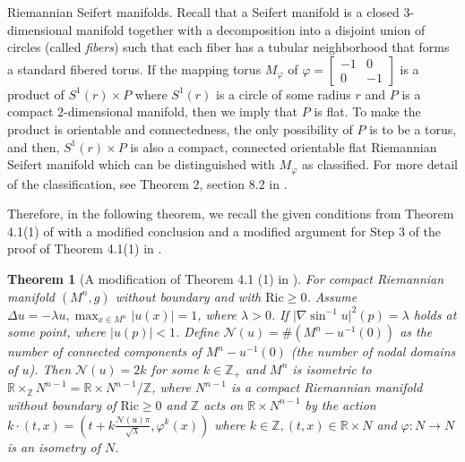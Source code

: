 \documentclass[11pt]{amsart}
\newtheorem{theorem}{Theorem}[section]
\def\ric{\mathrm{Ric}}
\begin{document}
Riemannian Seifert manifolds. Recall that a Seifert manifold is a closed 3-dimensional manifold together with a decomposition into a disjoint union of circles (called \textit{fibers}) such that each fiber has a tubular neighborhood that forms a standard fibered torus. If the mapping torus $M_\varphi$ of $\varphi=\left[\begin{matrix}
    -1&0\\0&-1
\end{matrix}\right]$ is a product of $S^1(r)\times P$ where $S^1(r)$ is a circle of some radius $r$ and $P$ is a compact $2$-dimensional manifold, then we imply that $P$ is flat. To make the product is orientable and connectedness, the only possibility of $P$ is to be a torus, and then, $S^1(r)\times P$ is also a compact, connected orientable flat
Riemannian Seifert manifold which can be distinguished with $M_\varphi$ as classified. For more detail of the classification, see Theorem 2,  section 8.2 in \cite{orlik}. 





Therefore, in the following theorem, we recall the given conditions from Theorem 4.1(1) of \cite{xuxue} with a modified conclusion and a modified argument for Step 3 of the proof of Theorem 4.1(1) in \cite{xuxue}.
\begin{theorem}[A modification of Theorem 4.1 (1) in \cite{xuxue}]\label{uoa}
   For compact Riemannian manifold $(M^n,g)$ without boundary and with $\ric\geq 0$. Assume $\Delta u=-\lambda u,\max_{x\in M^n}\vert u(x)\vert=1$, where $\lambda>0$. If $\vert\nabla\sin^{-1} u\vert^2 (p)=\lambda$ holds at some point, where $\vert u(p)\vert<1$. Define $\mathcal{N}(u)=\#(M^n-u^{-1}(0))$ as the number of connected components of $M^n-u^{-1}(0)$ (the number of nodal domains of $u$). Then $\mathcal{N}(u)=2k$ for some $k\in\mathbb{Z}_+$ and $M^n$ is isometric to $\mathbb{R}\times_\mathbb{Z} N^{n-1}=\mathbb{R}\times N^{n-1}/\mathbb{Z}$, where $N^{n-1}$ is a compact Riemannian manifold without boundary of $\ric\geq 0$ and $\mathbb{Z}$ acts on $\mathbb{R}\times N^{n-1}$ by the action $k\cdot (t,x)=\left(t+k\frac{\mathcal{N}(u)\pi}{\sqrt{\lambda}},\varphi^k(x)\right)$ where $k\in \mathbb{Z},(t,x)\in \mathbb{R}\times N$ and $\varphi:N\to N$ is an isometry of $N$.   
\end{theorem}
\end{document}
